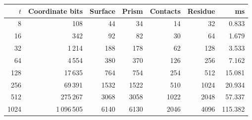 \begin{center}
\small
\begin{tabular}{rrrrrrr}
\toprule
$t$ & Coordinate bits & Surface & Prism & Contacts & Residue & ms\\
\midrule
8 & 108 & 44 & 34 & 14 & 32 & 0.833\\
16 & 342 & 92 & 82 & 30 & 64 & 1.679\\
32 & 1\,214 & 188 & 178 & 62 & 128 & 3.533\\
64 & 4\,554 & 380 & 370 & 126 & 256 & 7.162\\
128 & 17\,635 & 764 & 754 & 254 & 512 & 15.081\\
256 & 69\,391 & 1532 & 1522 & 510 & 1024 & 20.934\\
512 & 275\,267 & 3068 & 3058 & 1022 & 2048 & 57.337\\
1024 & 1\,096\,505 & 6140 & 6130 & 2046 & 4096 & 115.382\\
\bottomrule
\end{tabular}
\end{center}
